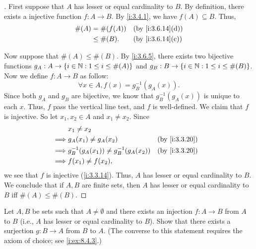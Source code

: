 \begin{proof}[]
  First suppose that \(A\) has lesser or equal cardinality to \(B\).
  By definition, there exists a injective function \(f : A \to B\).
  By \cref{i:3.4.1}, we have \(f(A) \subseteq B\).
  Thus,
  \begin{align*}
    \#(A) & = \#(f(A))  &  & \by{i:3.6.14}[d] \\
          & \leq \#(B). &  & \by{i:3.6.14}[c]
  \end{align*}

  Now suppose that \(\#(A) \leq \#(B)\).
  By \cref{i:3.6.5}, there exists two bijective functions \(g_A : A \to \left\lbrace i \in \mathbb{N} : 1 \leq i \leq \#(A)\right\rbrace\) and \(g_B : B \to \left\lbrace i \in \mathbb{N} : 1 \leq i \leq \#(B)\right\rbrace\).
  Now we define \(f : A \to B\) as follow:
  \[
    \forall x \in A, f(x) = g_B^{-1}(g_A(x)).
  \]
  Since both \(g_A\) and \(g_B\) are bijective, we know that \(g_B^{-1}(g_A(x))\) is unique to each \(x\).
  Thus, \(f\) pass the vertical line test, and \(f\) is well-defined.
  We claim that \(f\) is injective.
  So let \(x_1, x_2 \in A\) and \(x_1 \neq x_2\).
  Since
  \begin{align*}
             & x_1 \neq x_2                                                  \\
    \implies & g_A(x_1) \neq g_A(x_2)                     &  & \by{i:3.3.20} \\
    \implies & g_B^{-1}(g_A(x_1)) \neq g_B^{-1}(g_A(x_2)) &  & \by{i:3.3.20} \\
    \implies & f(x_1) \neq f(x_2),
  \end{align*}
  we see that \(f\) is injective (\cref{i:3.3.14}).
  Thus, \(A\) has lesser or equal cardinality to \(B\).
  We conclude that if \(A, B\) are finite sets, then \(A\) has lesser or equal cardinality to \(B\) iff \(\#(A) \leq \#(B)\).
\end{proof}

\begin{ex}\label{i:ex:3.6.8}
  Let \(A, B\) be sets such that \(A \neq \emptyset\) and there exists an injection \(f : A \to B\) from \(A\) to \(B\) (i.e., \(A\) has lesser or equal cardinality to \(B\)).
  Show that there exists a surjection \(g : B \to A\) from \(B\) to \(A\).
  (The converse to this statement requires the axiom of choice;
  see \cref{i:ex:8.4.3}.)
\end{ex}

